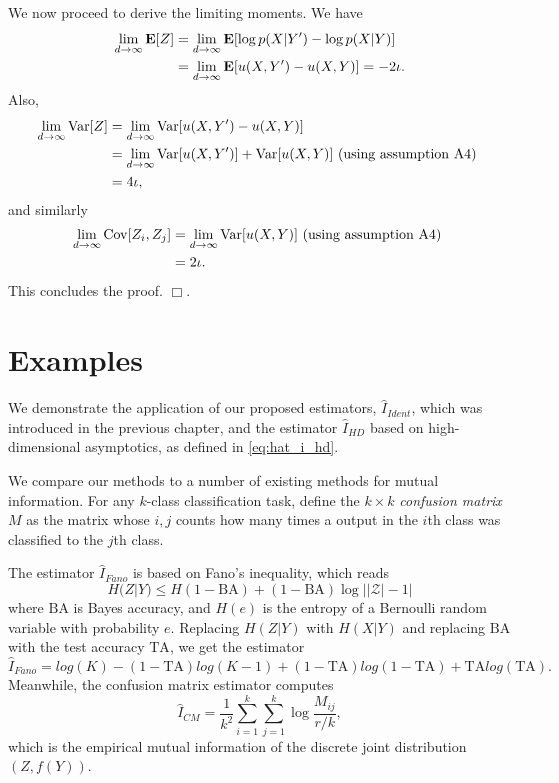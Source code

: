 We now proceed to derive the limiting moments.
We have
\begin{align*}
\lim_{d \to \infty} \textbf{E}[Z] 
&= \lim_{d \to \infty} \textbf{E}[ \log p(X|Y') - \log p(X|Y)]
\\&= \lim_{d \to \infty} \textbf{E}[ u(X, Y') - u(X, Y) ] = -2\iota.
\end{align*}
Also,
\begin{align*}
\lim_{d \to \infty} \text{Var}[Z]
 &= \lim_{d \to \infty} \text{Var}[ u(X, Y') - u(X, Y) ]
\\&= \lim_{d \to \infty} \text{Var}[ u(X, Y')] +\text{Var}[ u(X, Y) ]\text{ (using assumption A4) }
\\&= 4\iota,
\end{align*}
and similarly
\begin{align*}
\lim_{d \to \infty} \text{Cov}[Z_i, Z_j]
&= \lim_{d \to \infty} \text{Var}[ u(X, Y)]\text{ (using assumption A4) }
\\&= 2\iota.
\end{align*}
This concludes the proof. $\Box$.

\section{Examples}

We demonstrate the application of our proposed estimators,
$\hat{I}_{Ident}$, which was introduced in the previous chapter, and
the estimator $\hat{I}_{HD}$ based on high-dimensional asymptotics, as
defined in \eqref{eq:hat_i_hd}.

We compare our methods to a number of existing methods for mutual
information.  For any $k$-class classification task, define the $k
\times k$ \emph{confusion matrix} $M$ as the matrix whose $i, j$
counts how many times a output in the $i$th class was classified to
the $j$th class.

The estimator $\hat{I}_{Fano}$ is based on Fano's inequality, which reads
\[
H(Z|Y) \leq H(1-\text{BA}) + (1-\text{BA}) \log ||\mathcal{Z}| - 1|
\]
where $\text{BA}$ is Bayes accuracy, and $H(e)$ is the entropy of a
Bernoulli random variable with probability $e$.  Replacing $H(Z|Y)$
with $H(X|Y)$ and replacing $\text{BA}$ with the test accuracy $\text{TA}$,
we get the estimator
\[
\hat{I}_{Fano} = log(K) - (1-\text{TA}) log(K-1) + (1-\text{TA}) log(1-\text{TA}) + \text{TA} log(\text{TA}).
\]
Meanwhile, the confusion matrix estimator computes
\[
\hat{I}_{CM} = \frac{1}{k^2} \sum_{i=1}^k \sum_{j=1}^k \log \frac{M_{ij}}{r/k},
\]
which is the empirical mutual information of the discrete joint
distribution $(Z, f(Y))$.


